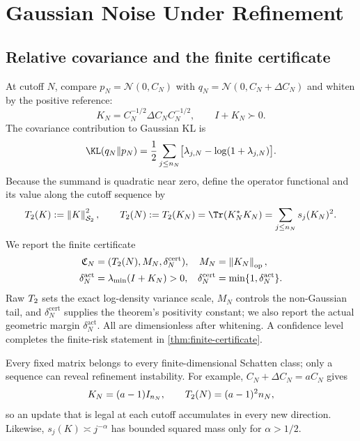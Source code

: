 \section{Gaussian Noise Under Refinement}
\label{sec:problem}

\subsection{Relative covariance and the finite certificate}

At cutoff $N$, compare
$p_N=\mathcal N(0,C_N)$ with
$q_N=\mathcal N(0,C_N+\Delta C_N)$ and whiten by the positive reference:
\begin{equation}
  K_N=C_N^{-1/2}\Delta C_NC_N^{-1/2},
  \qquad I+K_N\succ0.
  \label{eq:relative-covariance-cutoff}
\end{equation}
The covariance contribution to Gaussian KL is
\begin{equation}
  \KL(q_N\Vert p_N)
  =\frac12\sum_{j\le n_N}
    \bigl[\lambda_{j,N}-\log(1+\lambda_{j,N})\bigr].
  \label{eq:finite-gaussian-kl}
\end{equation}
Because the summand is quadratic near zero, define the operator functional and
its value along the cutoff sequence by
\begin{equation}
  \Ttwo(K):=\hsnorm{K}^{2},\qquad
  \Ttwo(N):=\Ttwo(K_N)
  =\Tr(K_N^\ast K_N)
  =\sum_{j\le n_N}s_j(K_N)^2.
  \label{eq:t2-definition}
\end{equation}
We report the finite certificate
\begin{equation}
  \begin{aligned}
    \mathfrak C_N&=(T_2(N),M_N,\delta_N^{\mathrm{cert}}),
    &M_N&=\left\lVert K_N \right\rVert_{\mathrm{op}},\\
    \delta_N^{\mathrm{act}}&=\lambda_{\min}(I+K_N)>0,
    &\delta_N^{\mathrm{cert}}&=\min\{1,\delta_N^{\mathrm{act}}\}.
  \end{aligned}
  \label{eq:finite-certificate}
\end{equation}
Raw $T_2$ sets the exact log-density variance scale, $M_N$ controls the
non-Gaussian tail, and $\delta_N^{\mathrm{cert}}$ supplies the theorem's
positivity constant; we also report the actual geometric margin
$\delta_N^{\mathrm{act}}$. All are dimensionless after whitening. A confidence
level completes the finite-risk statement in \cref{thm:finite-certificate}.

Every fixed matrix belongs to every finite-dimensional Schatten class; only a
sequence can reveal refinement instability. For example,
$C_N+\Delta C_N=aC_N$ gives
\begin{equation}
  K_N=(a-1)I_{n_N},
  \qquad T_2(N)=(a-1)^2n_N,
  \label{eq:identity-direction}
\end{equation}
so an update that is legal at each cutoff accumulates in every new direction.
Likewise, $s_j(K)\asymp j^{-\alpha}$ has bounded squared mass only for
$\alpha>1/2$.

